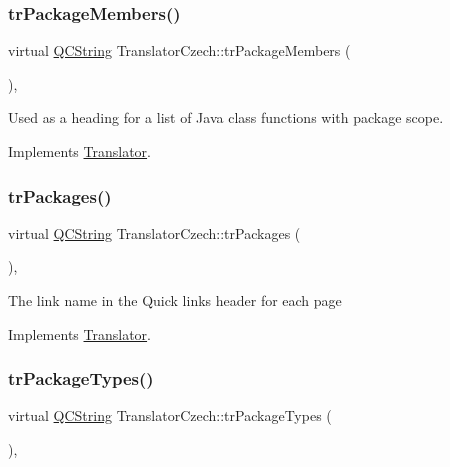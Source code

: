 \subsubsection{\texorpdfstring{trPackageMembers()}{trPackageMembers()}}
{\footnotesize\ttfamily virtual \mbox{\hyperlink{class_q_c_string}{Q\+C\+String}} Translator\+Czech\+::tr\+Package\+Members (\begin{DoxyParamCaption}{ }\end{DoxyParamCaption})\hspace{0.3cm}{\ttfamily [inline]}, {\ttfamily [virtual]}}

Used as a heading for a list of Java class functions with package scope. 

Implements \mbox{\hyperlink{class_translator}{Translator}}.

\mbox{\label{class_translator_czech_ac277d68bfff30f516e348d4cc6a7f86c}} 
\subsubsection{\texorpdfstring{trPackages()}{trPackages()}}
{\footnotesize\ttfamily virtual \mbox{\hyperlink{class_q_c_string}{Q\+C\+String}} Translator\+Czech\+::tr\+Packages (\begin{DoxyParamCaption}{ }\end{DoxyParamCaption})\hspace{0.3cm}{\ttfamily [inline]}, {\ttfamily [virtual]}}

The link name in the Quick links header for each page 

Implements \mbox{\hyperlink{class_translator}{Translator}}.

\mbox{\label{class_translator_czech_aea4c9b20ea5461d0060e8396f9157422}} 
\subsubsection{\texorpdfstring{trPackageTypes()}{trPackageTypes()}}
{\footnotesize\ttfamily virtual \mbox{\hyperlink{class_q_c_string}{Q\+C\+String}} Translator\+Czech\+::tr\+Package\+Types (\begin{DoxyParamCaption}{ }\end{DoxyParamCaption})\hspace{0.3cm}{\ttfamily [inline]}, {\ttfamily [virtual]}}

